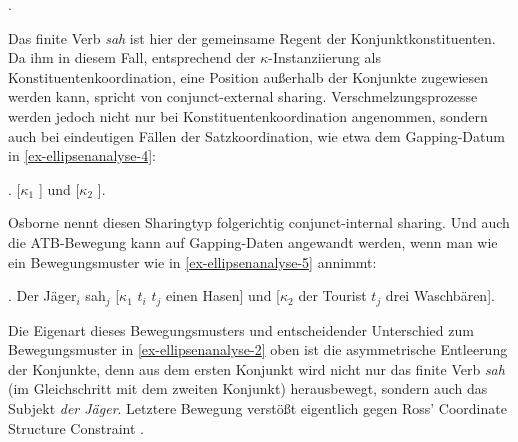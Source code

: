 \vspace{6ex}

\ex. 

Das finite Verb {\it sah} ist hier der gemeinsame Regent der Konjunktkonstituenten. Da ihm in diesem Fall, entsprechend der $\kappa$-Instanziierung als Konstituentenkoordination, eine Position au\ss erhalb der Konjunkte zugewiesen werden kann, spricht \cite{Osborne:08} von conjunct-external sharing. Verschmelzungsprozesse werden jedoch nicht nur bei Konstituentenkoordination angenommen, sondern auch  bei eindeutigen Fällen der Satzkoordination, wie etwa dem Gapping-Datum in \ref{ex-ellipsenanalyse-4}:  

\vspace{5ex}

\ex.\label{ex-ellipsenanalyse-4} [$\kappa_1$   ] und [$\kappa_2$  ].

Osborne nennt diesen Sharingtyp folgerichtig conjunct-internal sharing. Und auch die ATB-Bewegung kann auf Gapping-Daten angewandt werden, wenn man wie \cite{Johnson:04,Johnson:09} ein Bewegungsmuster wie in \ref{ex-ellipsenanalyse-5} annimmt:

\ex. \label{ex-ellipsenanalyse-5} Der Jäger$_i$ sah$_j$ [$\kappa_1$ $t_i$ $t_j$ einen Hasen] und [$\kappa_2$ der Tourist $t_j$ drei Waschbären].

Die Eigenart dieses Bewegungsmusters und entscheidender Unterschied zum Bewegungsmuster in \ref{ex-ellipsenanalyse-2} oben ist die asymmetrische Entleerung der Konjunkte, denn aus dem ersten Konjunkt wird nicht nur das finite Verb {\it sah} (im Gleichschritt mit dem zweiten Konjunkt) herausbewegt, sondern auch das Subjekt {\it der Jäger}. Letztere Bewegung verstö\ss t eigentlich gegen Ross' Coordinate Structure Constraint \citep[161]{Ross:67}. 

